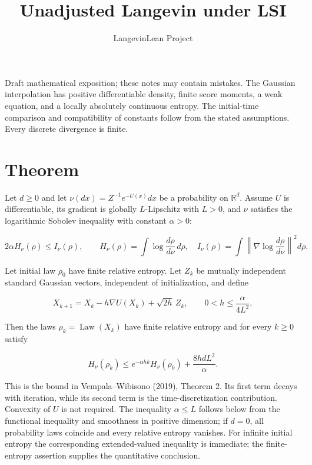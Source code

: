 \documentclass[11pt,a4paper]{article}
\title{\texorpdfstring{Unadjusted Langevin under LSI}{Unadjusted Langevin under LSI}}
\author{LangevinLean Project}
\date{}
\begin{document}
\maketitle
Draft mathematical exposition; these notes may contain mistakes.
The Gaussian interpolation has positive differentiable density, finite score moments, a weak equation, and a locally absolutely continuous entropy. The initial-time comparison and compatibility of constants follow from the stated assumptions. Every discrete divergence is finite.
\section{\texorpdfstring{Theorem}{Theorem}}


Let \(d\ge0\) and let \(\nu(dx)=Z^{-1}e^{-U(x)}dx\) be a probability on \(\mathbb R^d\). Assume \(U\) is differentiable, its gradient is globally \(L\)-Lipschitz with \(L>0\), and \(\nu\) satisfies the logarithmic Sobolev inequality with constant \(\alpha>0\):

\[2\alpha H_\nu(\rho)\le I_\nu(\rho),\qquad
H_\nu(\rho)=\int\log\frac{d\rho}{d\nu}\,d\rho,\quad
I_\nu(\rho)=\int\left\|\nabla\log\frac{d\rho}{d\nu}\right\|^2d\rho.\]

Let initial law \(\rho_0\) have finite relative entropy. Let \(Z_k\) be mutually independent standard Gaussian vectors, independent of initialization, and define

\[X_{k+1}=X_k-h\nabla U(X_k)+\sqrt{2h}\,Z_k,
\qquad 0<h\le\frac{\alpha}{4L^2},\]

Then the laws \(\rho_k=\operatorname{Law}(X_k)\) have finite relative entropy and for every \(k\ge0\) satisfy

\[\boxed{H_\nu(\rho_k)\le e^{-\alpha hk}H_\nu(\rho_0)+\frac{8hdL^2}{\alpha}.}\]

This is the bound in Vempala–Wibisono (2019), Theorem 2. Its first term decays with iteration, while its second term is the time-discretization contribution. Convexity of \(U\) is not required. The inequality \(\alpha\le L\) follows below from the functional inequality and smoothness in positive dimension; if \(d=0\), all probability laws coincide and every relative entropy vanishes. For infinite initial entropy the corresponding extended-valued inequality is immediate; the finite-entropy assertion supplies the quantitative conclusion.
\end{document}
